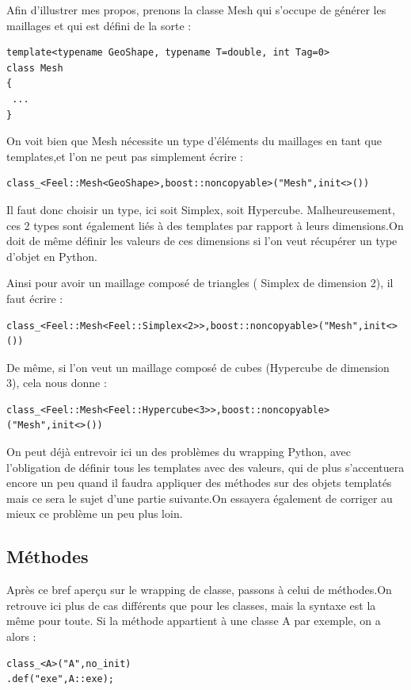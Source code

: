 \documentclass[french,12pt]{article}
\begin{document}
Afin d'illustrer mes propos, prenons la classe Mesh qui s'occupe de générer les maillages et qui est défini de la sorte :
\begin{lstlisting}
template<typename GeoShape, typename T=double, int Tag=0>
class Mesh
{
 ...
}
\end{lstlisting}

On voit bien que Mesh nécessite un type d'éléments du maillages en tant que templates,et l'on ne peut pas simplement écrire :

\newpage
\begin{lstlisting}
class_<Feel::Mesh<GeoShape>,boost::noncopyable>("Mesh",init<>())
\end{lstlisting}

Il faut donc choisir un type, ici soit Simplex, soit Hypercube. Malheureusement, ces 2 types sont également liés à des templates par rapport à leurs dimensions.On doit de même définir les valeurs de ces dimensions si l'on veut récupérer un type d'objet en Python.
\newline

Ainsi pour avoir un maillage composé de triangles ( Simplex de dimension 2), il faut écrire :
\begin{lstlisting}
class_<Feel::Mesh<Feel::Simplex<2>>,boost::noncopyable>("Mesh",init<>())
\end{lstlisting}

De même, si l'on veut un maillage composé de cubes (Hypercube de dimension 3), cela nous donne :
\begin{lstlisting}
class_<Feel::Mesh<Feel::Hypercube<3>>,boost::noncopyable>("Mesh",init<>())
\end{lstlisting}

On peut déjà entrevoir ici un des problèmes du wrapping Python, avec l'obligation de définir tous les templates avec des valeurs, qui de plus s'accentuera encore un peu quand il faudra appliquer des méthodes sur des objets templatés mais ce sera le sujet d'une partie suivante.On essayera également de corriger au mieux ce problème un peu plus loin.

\subsection{Méthodes}

Après ce bref aperçu sur le wrapping de classe, passons à celui de méthodes.On retrouve ici plus de cas différents que pour les classes, mais la syntaxe est la même pour toute.
\newline
Si la méthode appartient à une classe A par exemple, on a alors :
\begin{lstlisting}
class_<A>("A",no_init)
.def("exe",A::exe);
\end{lstlisting}
\end{document}
